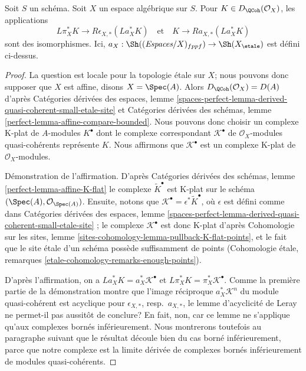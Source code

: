 \begin{lemma}
\label{lemma-cohomological-descent-etale-fppf-modules-unbounded}
Soit $S$ un schéma. Soit $X$ un espace algébrique sur $S$.
Pour $K \in D_\QCoh(\mathcal{O}_X)$, les applications
$$
L\pi_X^*K \longrightarrow R\epsilon_{X, *}(La_X^*K)
\quad\text{et}\quad
K \longrightarrow Ra_{X, *}(La_X^*K)
$$
sont des isomorphismes. Ici,
$a_X : \Sh((\textit{Espaces}/X)_{fppf}) \to \Sh(X_\etale)$ est défini ci-dessus.
\end{lemma}

\begin{proof}
La question est locale pour la topologie étale sur $X$; nous pouvons donc
supposer que $X$ est affine, disons $X = \Spec(A)$. Alors
$D_\QCoh(\mathcal{O}_X) = D(A)$ d'après Catégories dérivées des espaces, lemme
\ref{spaces-perfect-lemma-derived-quasi-coherent-small-etale-site}
et Catégories dérivées des schémas, lemme
\ref{perfect-lemma-affine-compare-bounded}.
Nous pouvons donc choisir un complexe K-plat de $A$-modules $K^\bullet$ dont
le complexe correspondant $\mathcal{K}^\bullet$ de $\mathcal{O}_X$-modules
quasi-cohérents représente $K$.
Nous affirmons que $\mathcal{K}^\bullet$ est un complexe K-plat de
$\mathcal{O}_X$-modules.

\medskip\noindent
Démonstration de l'affirmation. D'après Catégories dérivées des schémas, lemme
\ref{perfect-lemma-affine-K-flat}
le complexe $\widetilde{K}^\bullet$ est K-plat sur le schéma
$(\Spec(A), \mathcal{O}_{\Spec(A)})$.
Ensuite, notons que $\mathcal{K}^\bullet = \epsilon^*\widetilde{K}^\bullet$,
où $\epsilon$ est défini comme dans Catégories dérivées des espaces, lemme
\ref{spaces-perfect-lemma-derived-quasi-coherent-small-etale-site}
; le complexe $\mathcal{K}^\bullet$ est donc K-plat d'après Cohomologie sur les
sites, lemme \ref{sites-cohomology-lemma-pullback-K-flat-points}, et le fait que
le site étale d'un schéma possède suffisamment de points (Cohomologie étale,
remarques \ref{etale-cohomology-remarks-enough-points}).

\medskip\noindent
D'après l'affirmation, on a
$La_X^*K = a_X^*\mathcal{K}^\bullet$ et
$L\pi_X^*K = \pi_X^*\mathcal{K}^\bullet$.
Comme la première partie de la démonstration montre que l'image réciproque
$a_X^*\mathcal{K}^n$ du module quasi-cohérent est acyclique pour
$\epsilon_{X, *}$, resp.\ $a_{X, *}$, le lemme d'acyclicité de Leray ne
permet-il pas aussitôt de conclure? En fait, non, car ce lemme ne s'applique
qu'aux complexes bornés inférieurement. Nous montrerons toutefois au paragraphe
suivant que le résultat découle bien du cas borné inférieurement, parce que
notre complexe est la limite dérivée de complexes bornés inférieurement de
modules quasi-cohérents.


\end{proof}
